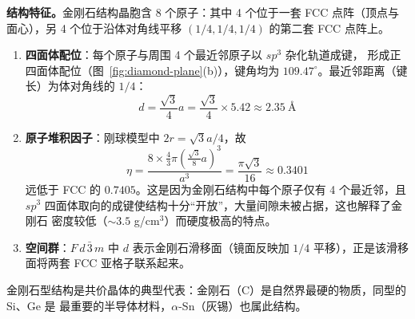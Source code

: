 \textbf{结构特征。}金刚石结构晶胞含 8 个原子：其中 4 个位于一套 FCC 点阵（顶点与
面心），另 4 个位于沿体对角线平移 $(1/4,1/4,1/4)$ 的第二套 FCC 点阵上。

\begin{enumerate}[label=（\arabic*）]
  \item \textbf{四面体配位}：每个原子与周围 4 个最近邻原子以 $sp^3$ 杂化轨道成键，
    形成正四面体配位（图~\ref{fig:diamond-plane}(b)），键角均为
    $109.47^\circ$。最近邻距离（键长）为体对角线的 $1/4$：
    \begin{equation}
      d=\frac{\sqrt{3}}{4}a=\frac{\sqrt{3}}{4}\times5.42\approx2.35\ \text{\AA}
    \end{equation}
  \item \textbf{原子堆积因子}：刚球模型中 $2r=\sqrt{3}a/4$，故
    \begin{equation}
      \eta=\frac{8\times\frac{4}{3}\pi\left(\frac{\sqrt{3}}{8}a\right)^3}{a^3}
        =\frac{\pi\sqrt{3}}{16}\approx0.3401
    \end{equation}
    远低于 FCC 的 $0.7405$。这是因为金刚石结构中每个原子仅有 4 个最近邻，且
    $sp^3$ 四面体取向的成键使结构十分``开放''，大量间隙未被占据，这也解释了金刚石
    密度较低（$\sim3.5$ g/cm$^3$）而硬度极高的特点。
  \item \textbf{空间群}：$F\,d\,\bar3\,m$ 中 $d$ 表示金刚石滑移面（镜面反映加
    $1/4$ 平移），正是该滑移面将两套 FCC 亚格子联系起来。
\end{enumerate}

金刚石型结构是共价晶体的典型代表：金刚石（C）是自然界最硬的物质，同型的 Si、Ge 是
最重要的半导体材料，$\alpha$-Sn（灰锡）也属此结构。
